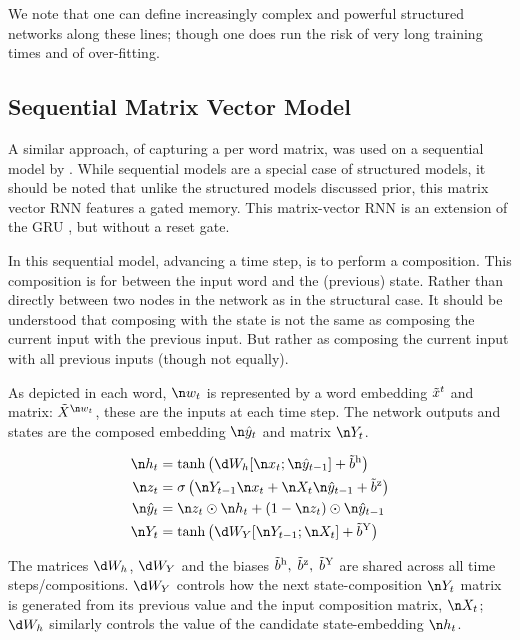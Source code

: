 {We note that one can define increasingly complex and powerful structured networks along these lines; though one does run the risk of very long training times and of over-fitting.

\subsection{Sequential Matrix Vector Model}
A similar approach, of capturing a per word matrix, 
was used on a sequential model by .
While sequential models are a special case of structured models,
it should be noted that unlike the structured models discussed prior,
this matrix vector RNN features a gated memory.
This matrix-vector RNN is an extension of the GRU , but without a reset gate.


In this sequential model, advancing a time step, is to perform a composition.
This composition is for between the input word and the (previous) state.
Rather than directly between two nodes in the network as in the structural case.
It should be understood that composing with the state is not the same as composing the current input with the previous input.
But rather as composing the current input with all previous inputs (though not equally).

As depicted in  each word, $\n w_t$ is represented by a word embedding $\nv x_{t}$ and matrix: $\nv X_{\n w_t}$, these are the inputs at each time step.
The network outputs and states are the composed embedding $\n \hat{y}_t$ and matrix $\n Y_t$.



\begin{align}
\n h_t &= \tanh\left(\d W_h [\n x_t; \n \hat{y}_{t-1}] + \dv b_h \right)\\
\n z_t &= \sigma\left(\n Y_{t-1} \n x_t + \n X_t \n \hat{y}_{t-1} + \dv b_z \right)\\
%
\n \hat{y}_t &= \n z_t \odot \n h_t + (1 - \n z_t) \odot \n \hat{y}_{t-1} \\
\n Y_t &= \tanh \left( \d W_Y [\n Y_{t-1}; \n X_t] + \dv b_Y \right)
\end{align}



The matrices $\d W_h$, $\d W_Y$ and the biases $\dv b_h,\; \dv b_z,\; \dv b_Y$ are shared across all time steps/compositions.
$\d W_Y$ controls how the next state-composition $\n Y_t$ matrix is generated from its previous value and the input composition matrix, $\n X_t$;
$\d W_h$ similarly controls the value of the candidate state-embedding $\n h_t$.

}
